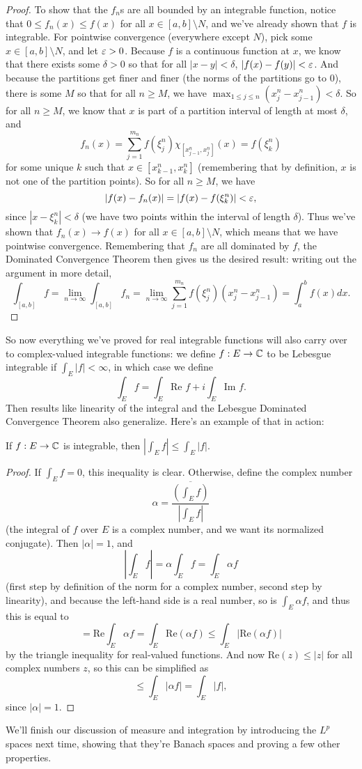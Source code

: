 \begin{proof}
To show that the $f_n$s are all bounded by an integrable function, notice that $0 \le f_n(x) \le f(x)$ for all $x \in [a, b] \setminus N$, and we've already shown that $f$ is integrable. For pointwise convergence (everywhere except $N$), pick some $x \in [a, b] \setminus N$, and let $\varepsilon > 0$. Because $f$ is a continuous function at $x$, we know that there exists some $\delta > 0$ so that for all $|x-y| < \delta$, $|f(x) - f(y)| < \varepsilon$. And because the partitions get finer and finer (the norms of the partitions go to $0$), there is some $M$ so that for all $n \ge M$, we have $\max_{1 \le j \le n} (x_j^n - x_{j-1}^n) < \delta$. So for all $n \ge M$, we know that $x$ is part of a partition interval of length at most $\delta$, and 
\[
    f_n(x) = \sum_{j=1}^{m_n} f(\xi_j^n) \chi_{[x_{j-1}^n, x_j^n]}(x) = f(\xi_k^n)
\]
for some unique $k$ such that $x \in [x_{k-1}^n, x_k^n]$ (remembering that by definition, $x$ is not one of the partition points). So for all $n \ge M$, we have 
\[
    |f(x) - f_n(x)| = |f(x) - f(\xi_k^n)| < \varepsilon,
\]
since $|x - \xi_k^n| < \delta$ (we have two points within the interval of length $\delta$). Thus we've shown that $f_n(x) \to f(x)$ for all $x \in [a, b] \setminus N$, which means that we have pointwise convergence. Remembering that $f_n$ are all dominated by $f$, the Dominated Convergence Theorem then gives us the desired result: writing out the argument in more detail,
\[
    \int_{[a, b]} f = \lim_{n \to \infty} \int_{[a, b]} f_n = \lim_{n \to \infty} \sum_{j=1}^{m_n} f(\xi_j^n) (x_j^n - x_{j-1}^n) = \int_a^b f(x) dx.
\]
\end{proof}

So now everything we've proved for real integrable functions will also carry over to complex-valued integrable functions: we define $f: E \to \mathbb C$ to be Lebesgue integrable if $\int_E |f| < \infty$, in which case we define 
\[
    \int_E f = \int_E \text{Re } f + i \int_E \text{Im } f.
\]
Then results like linearity of the integral and the Lebesgue Dominated Convergence Theorem also generalize. Here's an example of that in action:

\begin{proposition}
If $f: E \to \mathbb C$ is integrable, then $\left|\int_E f\right| \le \int_E |f|$.
\end{proposition}
\begin{proof}
If $\int_E f = 0$, this inequality is clear. Otherwise, define the complex number 
\[
    \alpha = \frac{\overline{\left(\int_E f\right)}}{\left|\int_E f\right|}
\]
(the integral of $f$ over $E$ is a complex number, and we want its normalized conjugate). Then $|\alpha| = 1$, and 
\[
    \left|\int_E f\right| = \alpha \int_E f = \int_E \alpha f
\]
(first step by definition of the norm for a complex number, second step by linearity), and because the left-hand side is a real number, so is $\int_E \alpha f$, and thus this is equal to 
\[
    = \text{Re} \int_E \alpha f = \int_E \text{Re}(\alpha f) \le \int_E \left|\text{Re}(\alpha f)\right|  
\]
by the triangle inequality for real-valued functions. And now $\text{Re}(z) \le |z|$ for all complex numbers $z$, so this can be simplified as
\[
    \le \int_E |\alpha f| = \int_E |f|,
\]
since $|\alpha| = 1$.
\end{proof}

We'll finish our discussion of measure and integration by introducing the $L^p$ spaces next time, showing that they're Banach spaces and proving a few other properties.
